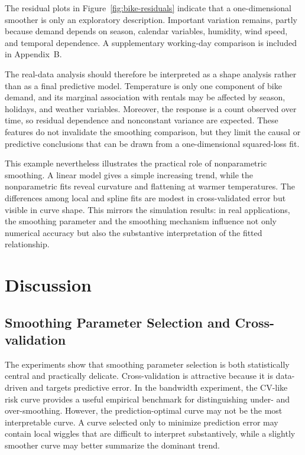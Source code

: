 \documentclass[12pt,a4paper]{article}
\newcommand{\FloatBarrier}{\par}
\begin{document}
The residual plots in Figure~\ref{fig:bike-residuals} indicate that a one-dimensional smoother is only an exploratory description. Important variation remains, partly because demand depends on season, calendar variables, humidity, wind speed, and temporal dependence. A supplementary working-day comparison is included in Appendix~B.

The real-data analysis should therefore be interpreted as a shape analysis rather than as a final predictive model. Temperature is only one component of bike demand, and its marginal association with rentals may be affected by season, holidays, and weather variables. Moreover, the response is a count observed over time, so residual dependence and nonconstant variance are expected. These features do not invalidate the smoothing comparison, but they limit the causal or predictive conclusions that can be drawn from a one-dimensional squared-loss fit.

This example nevertheless illustrates the practical role of nonparametric smoothing. A linear model gives a simple increasing trend, while the nonparametric fits reveal curvature and flattening at warmer temperatures. The differences among local and spline fits are modest in cross-validated error but visible in curve shape. This mirrors the simulation results: in real applications, the smoothing parameter and the smoothing mechanism influence not only numerical accuracy but also the substantive interpretation of the fitted relationship.
\FloatBarrier
\FloatBarrier


\section{Discussion}
\label{sec:discussion}

\subsection{Smoothing Parameter Selection and Cross-validation}

The experiments show that smoothing parameter selection is both statistically central and practically delicate. Cross-validation is attractive because it is data-driven and targets predictive error. In the bandwidth experiment, the CV-like risk curve provides a useful empirical benchmark for distinguishing under- and over-smoothing. However, the prediction-optimal curve may not be the most interpretable curve. A curve selected only to minimize prediction error may contain local wiggles that are difficult to interpret substantively, while a slightly smoother curve may better summarize the dominant trend.
\end{document}
